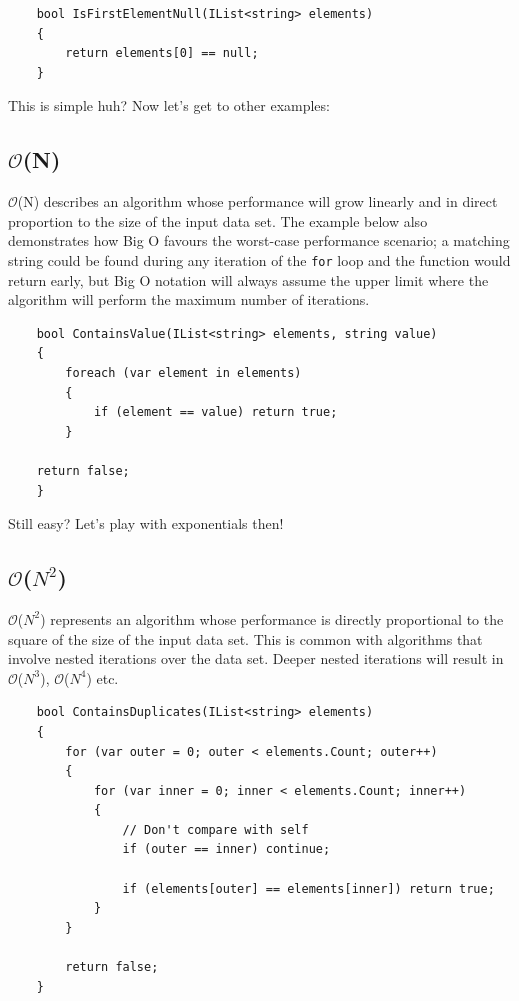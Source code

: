 \documentclass[12pt]{article}
\begin{document}
\begin{verbatim}
    bool IsFirstElementNull(IList<string> elements)
    {
        return elements[0] == null;
    }
\end{verbatim}

This is simple huh? Now let's get to other examples:

\subsection{$\mathcal{O}$(N)}
$\mathcal{O}$(N) describes an algorithm whose performance will grow linearly and in direct proportion to the size of the input data set. The example below also demonstrates how Big O favours the worst-case performance scenario; a matching string could be found during any iteration of the \texttt{for} loop and the function would return early, but Big O notation will always assume the upper limit where the algorithm will perform the maximum number of iterations.

\begin{verbatim}
    bool ContainsValue(IList<string> elements, string value)
    {
        foreach (var element in elements)
        {
            if (element == value) return true;
        }

    return false;
    }
\end{verbatim}

Still easy? Let's play with exponentials then!

\newpage
\subsection{$\mathcal{O}$($N^2$)}
$\mathcal{O}$($N^2$) represents an algorithm whose performance is directly proportional to the square of the size of the input data set. This is common with algorithms that involve nested iterations over the data set. Deeper nested iterations will result in $\mathcal{O}$($N^3$), $\mathcal{O}$($N^4$) etc.

\begin{verbatim}
    bool ContainsDuplicates(IList<string> elements)
    {
        for (var outer = 0; outer < elements.Count; outer++)
        {
            for (var inner = 0; inner < elements.Count; inner++)
            {
                // Don't compare with self
                if (outer == inner) continue;

                if (elements[outer] == elements[inner]) return true;
            }
        }

        return false;
    }
\end{verbatim}
\end{document}
